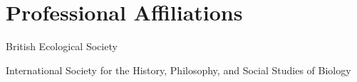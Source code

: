 \documentclass[letterpaper]{article}
\renewenvironment{itemize}{
  \begin{list}{}{
    \setlength{\leftmargin}{1.5em}
  }
}{
  \end{list}
}
\begin{document}
\section*{Professional Affiliations}
\begin{itemize}
\item British Ecological Society
\item International Society for the History, Philosophy, and Social Studies of Biology
\end{itemize}






\end{document}
